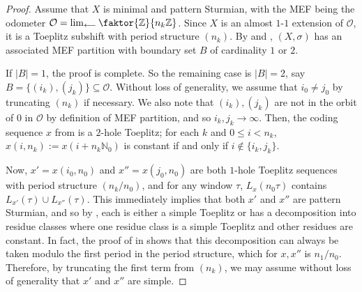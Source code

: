 \documentclass[11pt,reqno]{amsart}
\theoremstyle{definition}
\theoremstyle{plain}
\newcommand{\Z}{\mathbb{Z}}
\newcommand{\AuthornoteA}[2]{{\sf\small\color{magenta}{[#1: #2]}}}
\newcommand{\AuthornoteR}[2]{{\sf\small\color{blue}{[#1: #2]}}}
\newcommand{\Anote}{\AuthornoteA{A}}
\newcommand{\rp}{\AuthornoteR{R}}
\begin{document}
\begin{proof}
Assume that $X$ is minimal and pattern Sturmian, with the MEF being the odometer $\mathcal{O} = \lim_{\longleftarrow} \faktor{\Z}{n_k \Z}$. Since $X$ is an almost $1$-$1$ extension of $\mathcal{O}$, it is a Toeplitz subshift with period structure $(n_k)$.
By  and , $(X, \sigma)$ has an associated MEF partition with boundary set $B$ of cardinality $1$ or $2$.


If $|B| = 1$, the proof is complete. So the remaining case is $|B| = 2$, say $B = \{(i_k), (j_k)\} \subseteq \mathcal{O}$. Without loss of generality, we assume that $i_0 \neq j_0$ by truncating $(n_k)$ if necessary. We also note that $(i_k), (j_k)$ are not in the orbit of $0$ in $\mathcal{O}$ by definition of MEF partition, and so $i_k, j_k \rightarrow \infty$.
Then, the coding sequence $x$ from  is a $2$-hole Toeplitz; for each $k$ and $0 \leq i < n_k$, $x(i, n_k) := x(i + n_k \mathbb{N}_0)$ is constant if and only if $i \notin \{i_k, j_k\}$. 

Now, $x' = x(i_0, n_0)$ and $x'' = x(j_0, n_0)$ are both $1$-hole Toeplitz sequences with period structure $(n_k/n_0)$, and for any window $\tau$, $L_x(n_0 \tau)$ contains $L_{x'}(\tau) \cup L_{x''}(\tau)$. This immediately implies that both $x'$ and $x''$ are pattern Sturmian, and so by , each is either a simple Toeplitz or has a decomposition into residue classes where one residue class is a simple Toeplitz and other residues are constant. %
In fact, the proof of  in \cite{Gjini_Kamae_Bo_Yu-Mei-toeplitz} %
shows that this decomposition can always be taken modulo the first period in the period structure, which for $x, x''$ is $n_1/n_0$.
Therefore, by truncating the first term from $(n_k)$, we may assume without loss of generality that $x'$ and $x''$ are simple.


\end{proof}
\end{document}
